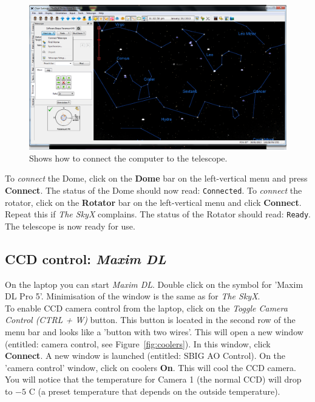 \documentclass[12pt,twoside,a4paper]{report}
\begin{document}
\begin{figure}[ht]
 \centering
    \includegraphics[width=\textwidth]{documentation_images/connect_telescope.png}
    \caption{\label{fig:connect_telescope} Shows how to connect the computer to the telescope.}
\end{figure}

To \textit{connect} the Dome, click on the \textbf{Dome} bar on the left-vertical menu and press 
\textbf{Connect}. The status of the Dome should now read: \textcolor{PineGreen}{\tt Connected}.
To \textit{connect} the rotator, click on the \textbf{Rotator} bar on the left-vertical menu and 
click \textbf{Connect}. Repeat this if \emph{The SkyX} complains.  The status of the Rotator should 
read: \textcolor{PineGreen}{\tt Ready}. The telescope is now ready for use.

\subsection{CCD control: \emph{Maxim DL}}

On the laptop you can start \emph{Maxim DL}. Double click on the symbol for 'Maxim DL Pro 5'. 
Minimisation of the window is the same as for \emph{The SkyX}.\\

To enable CCD camera control from the laptop, click on the \textit{Toggle Camera Control (CTRL + W)} button.
This button is located in the second row of the menu bar and looks like a 'button with two wires'. 
This will open a new window (entitled: camera control, see Figure~\ref{fig:coolers}).  
In this window, click \textbf{Connect}. 
A new window is launched (entitled: SBIG AO Control). On the 'camera control' window, click on
coolers \textbf{On}. This will cool the CCD camera. You will notice that the temperature for 
Camera 1 (the normal CCD) will drop to $-5$ C (a preset temperature that depends on the outside 
temperature).\\
\end{document}
